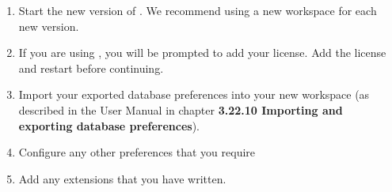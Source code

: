 \begin{enumerate}
\item Start the new version of \app{}. We recommend using a new workspace for each new version. 
\item If you are using \gd{}, you will be prompted to add your license. Add the license and restart \gd{} before continuing. 
\item Import your exported database preferences into your new workspace  (as described in the User Manual in chapter \textbf{3.22.10 Importing and exporting database preferences}).
\item Configure any other preferences that you require
\item Add any extensions that you have written. 
\end{enumerate}
